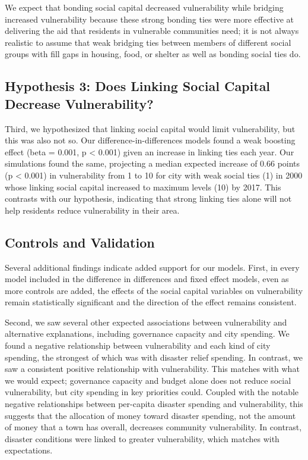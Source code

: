 \documentclass[]{elsarticle} %
\begin{document}
We expect that bonding social capital decreased vulnerability while
bridging increased vulnerability because these strong bonding ties were
more effective at delivering the aid that residents in vulnerable
communities need; it is not always realistic to assume that weak
bridging ties between members of different social groups with fill gaps
in housing, food, or shelter as well as bonding social ties do.

\hypertarget{hypothesis-3-does-linking-social-capital-decrease-vulnerability}{%
\subsection{Hypothesis 3: Does Linking Social Capital Decrease
Vulnerability?}\label{hypothesis-3-does-linking-social-capital-decrease-vulnerability}}

Third, we hypothesized that linking social capital would limit
vulnerability, but this was also not so. Our difference-in-differences
models found a weak boosting effect (beta = 0.001, p \textless{} 0.001)
given an increase in linking ties each year. Our simulations found the
same, projecting a median expected increase of 0.66 points (p
\textless{} 0.001) in vulnerability from 1 to 10 for city with weak
social ties (1) in 2000 whose linking social capital increased to
maximum levels (10) by 2017. This contrasts with our hypothesis,
indicating that strong linking ties alone will not help residents reduce
vulnerability in their area.

\hypertarget{controls-and-validation}{%
\subsection{Controls and Validation}\label{controls-and-validation}}

Several additional findings indicate added support for our models.
First, in every model included in the difference in differences and
fixed effect models, even as more controls are added, the effects of the
social capital variables on vulnerability remain statistically
significant and the direction of the effect remains consistent.

Second, we saw several other expected associations between vulnerability
and alternative explanations, including governance capacity and city
spending. We found a negative relationship between vulnerability and
each kind of city spending, the strongest of which was with disaster
relief spending. In contrast, we saw a consistent positive relationship
with vulnerability. This matches with what we would expect; governance
capacity and budget alone does not reduce social vulnerability, but city
spending in key priorities could. Coupled with the notable negative
relationships between per-capita disaster spending and vulnerability,
this suggests that the allocation of money toward disaster spending, not
the amount of money that a town has overall, decreases community
vulnerability. In contrast, disaster conditions were linked to greater
vulnerability, which matches with expectations.
\end{document}

